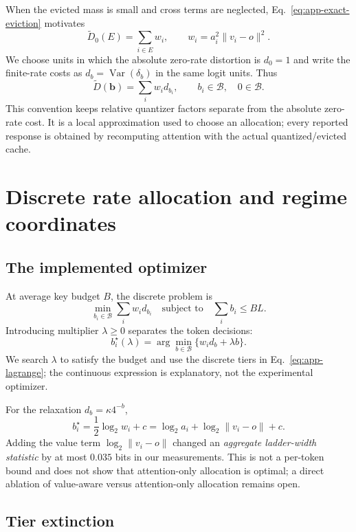When the evicted mass is small and cross terms are neglected,
Eq.~\eqref{eq:app-exact-eviction} motivates
\[
 \widetilde D_0(E)=\sum_{i\in E} w_i,
 \qquad
 w_i=a_i^2\|v_i-o\|^2.
\]
We choose units in which the absolute zero-rate distortion is $d_0=1$ and write
the finite-rate costs as $d_b=\operatorname{Var}(\delta_b)$ in the same logit
units.  Thus
\[
 \widetilde D(\mathbf b)=\sum_i w_i d_{b_i},
 \qquad b_i\in\mathcal B,\quad 0\in\mathcal B.
\]
This convention keeps relative quantizer factors separate from the absolute zero-rate
cost.  It is a local approximation used to choose an allocation; every
reported response is obtained by recomputing attention with the actual
quantized/evicted cache.

\section{Discrete rate allocation and regime coordinates}
\label{app:allocation}

\subsection{The implemented optimizer}

At average key budget $B$, the discrete problem is
\begin{equation}
 \min_{b_i\in\mathcal B}\sum_i w_i d_{b_i}
 \quad\text{subject to}\quad
 \sum_i b_i\le BL.
 \label{eq:app-discrete}
\end{equation}
Introducing multiplier $\lambda\ge0$ separates the token decisions:
\begin{equation}
 b_i^\star(\lambda)
 =\arg\min_{b\in\mathcal B}\{w_i d_b+\lambda b\}.
 \label{eq:app-lagrange}
\end{equation}
We search $\lambda$ to satisfy the budget and use the discrete tiers in
Eq.~\eqref{eq:app-lagrange}; the continuous expression is explanatory, not the
experimental optimizer.

For the relaxation $d_b=\kappa 4^{-b}$,
\[
 b_i^\star
 =\frac12\log_2w_i+c
 =\log_2a_i+\log_2\|v_i-o\|+c.
\]
Adding the value term $\log_2\|v_i-o\|$ changed an \emph{aggregate
ladder-width statistic} by at most $0.035$ bits in our measurements.  This is
not a per-token bound and does not show that attention-only allocation is
optimal; a direct ablation of value-aware versus attention-only allocation
remains open.

\subsection{Tier extinction}

